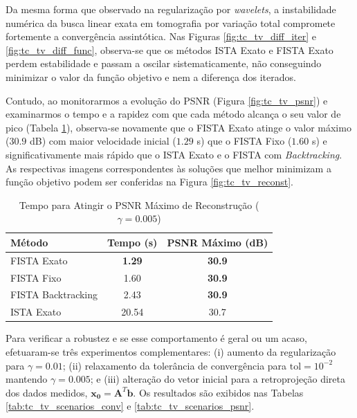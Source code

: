 \documentclass[12pt]{article}
\begin{document}
Da mesma forma que observado na regularização por \textit{wavelets}, a instabilidade numérica da busca linear exata em tomografia por variação total compromete fortemente a convergência assintótica. Nas Figuras \ref{fig:tc_tv_diff_iter} e \ref{fig:tc_tv_diff_func}, observa-se que os métodos ISTA Exato e FISTA Exato perdem estabilidade e passam a oscilar sistematicamente, não conseguindo minimizar o valor da função objetivo e nem a diferença dos iterados. 

Contudo, ao monitorarmos a evolução do PSNR (Figura \ref{fig:tc_tv_psnr}) e examinarmos o tempo e a rapidez com que cada método alcança o seu valor de pico (Tabela \ref{tab:tc_tv_psnr_pico}), observa-se novamente que o FISTA Exato atinge o valor máximo ($30.9$ dB) com maior velocidade inicial ($1.29$ s) que o FISTA Fixo ($1.60$ s) e significativamente mais rápido que o ISTA Exato e o FISTA com \textit{Backtracking}. As respectivas imagens correspondentes às soluções que melhor minimizam a função objetivo podem ser conferidas na Figura \ref{fig:tc_tv_reconst}.
\begin{table}[H]
    \centering
    \caption{Tempo para Atingir o PSNR Máximo de Reconstrução ($\gamma=0.005$)}
    \label{tab:tc_tv_psnr_pico}
    \begin{tabular}{lcc}
        \toprule
        \textbf{Método} & \textbf{Tempo (s)} & \textbf{PSNR Máximo (dB)} \\
        \midrule
        FISTA Exato & \textbf{1.29} & \textbf{30.9} \\
        FISTA Fixo & 1.60 & \textbf{30.9} \\
        FISTA Backtracking & 2.43 & \textbf{30.9} \\
        ISTA Exato & 20.54 & 30.7 \\
        \bottomrule
    \end{tabular}
\end{table}

Para verificar a robustez e se esse comportamento é geral ou um acaso, efetuaram-se três experimentos complementares: (i) aumento da regularização para $\gamma = 0.01$; (ii) relaxamento da tolerância de convergência para $\text{tol} = 10^{-2}$ mantendo $\gamma=0.005$; e (iii) alteração do vetor inicial para a retroprojeção direta dos dados medidos, $\mathbf{x_0} = \mathbf{A}^T \mathbf{b}$. Os resultados são exibidos nas Tabelas \ref{tab:tc_tv_scenarios_conv} e \ref{tab:tc_tv_scenarios_psnr}.
\end{document}
